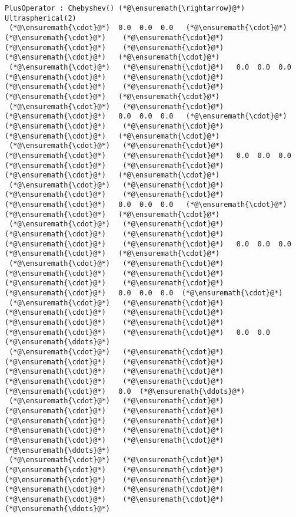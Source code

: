 \documentclass[12pt,landscape]{article}
\begin{document}
{\begin{lstlisting}
PlusOperator : Chebyshev() (*@\ensuremath{\rightarrow}@*) Ultraspherical(2)
 (*@\ensuremath{\cdot}@*)  0.0  0.0  0.0   (*@\ensuremath{\cdot}@*)    (*@\ensuremath{\cdot}@*)    (*@\ensuremath{\cdot}@*)    (*@\ensuremath{\cdot}@*)    (*@\ensuremath{\cdot}@*)    (*@\ensuremath{\cdot}@*)   (*@\ensuremath{\cdot}@*)
 (*@\ensuremath{\cdot}@*)   (*@\ensuremath{\cdot}@*)   0.0  0.0  0.0   (*@\ensuremath{\cdot}@*)    (*@\ensuremath{\cdot}@*)    (*@\ensuremath{\cdot}@*)    (*@\ensuremath{\cdot}@*)    (*@\ensuremath{\cdot}@*)   (*@\ensuremath{\cdot}@*)
 (*@\ensuremath{\cdot}@*)   (*@\ensuremath{\cdot}@*)    (*@\ensuremath{\cdot}@*)   0.0  0.0  0.0   (*@\ensuremath{\cdot}@*)    (*@\ensuremath{\cdot}@*)    (*@\ensuremath{\cdot}@*)    (*@\ensuremath{\cdot}@*)   (*@\ensuremath{\cdot}@*)
 (*@\ensuremath{\cdot}@*)   (*@\ensuremath{\cdot}@*)    (*@\ensuremath{\cdot}@*)    (*@\ensuremath{\cdot}@*)   0.0  0.0  0.0   (*@\ensuremath{\cdot}@*)    (*@\ensuremath{\cdot}@*)    (*@\ensuremath{\cdot}@*)   (*@\ensuremath{\cdot}@*)
 (*@\ensuremath{\cdot}@*)   (*@\ensuremath{\cdot}@*)    (*@\ensuremath{\cdot}@*)    (*@\ensuremath{\cdot}@*)    (*@\ensuremath{\cdot}@*)   0.0  0.0  0.0   (*@\ensuremath{\cdot}@*)    (*@\ensuremath{\cdot}@*)   (*@\ensuremath{\cdot}@*)
 (*@\ensuremath{\cdot}@*)   (*@\ensuremath{\cdot}@*)    (*@\ensuremath{\cdot}@*)    (*@\ensuremath{\cdot}@*)    (*@\ensuremath{\cdot}@*)    (*@\ensuremath{\cdot}@*)   0.0  0.0  0.0   (*@\ensuremath{\cdot}@*)   (*@\ensuremath{\cdot}@*)
 (*@\ensuremath{\cdot}@*)   (*@\ensuremath{\cdot}@*)    (*@\ensuremath{\cdot}@*)    (*@\ensuremath{\cdot}@*)    (*@\ensuremath{\cdot}@*)    (*@\ensuremath{\cdot}@*)    (*@\ensuremath{\cdot}@*)   0.0  0.0  0.0  (*@\ensuremath{\cdot}@*)
 (*@\ensuremath{\cdot}@*)   (*@\ensuremath{\cdot}@*)    (*@\ensuremath{\cdot}@*)    (*@\ensuremath{\cdot}@*)    (*@\ensuremath{\cdot}@*)    (*@\ensuremath{\cdot}@*)    (*@\ensuremath{\cdot}@*)    (*@\ensuremath{\cdot}@*)   0.0  0.0  (*@\ensuremath{\ddots}@*)
 (*@\ensuremath{\cdot}@*)   (*@\ensuremath{\cdot}@*)    (*@\ensuremath{\cdot}@*)    (*@\ensuremath{\cdot}@*)    (*@\ensuremath{\cdot}@*)    (*@\ensuremath{\cdot}@*)    (*@\ensuremath{\cdot}@*)    (*@\ensuremath{\cdot}@*)    (*@\ensuremath{\cdot}@*)   0.0  (*@\ensuremath{\ddots}@*)
 (*@\ensuremath{\cdot}@*)   (*@\ensuremath{\cdot}@*)    (*@\ensuremath{\cdot}@*)    (*@\ensuremath{\cdot}@*)    (*@\ensuremath{\cdot}@*)    (*@\ensuremath{\cdot}@*)    (*@\ensuremath{\cdot}@*)    (*@\ensuremath{\cdot}@*)    (*@\ensuremath{\cdot}@*)    (*@\ensuremath{\cdot}@*)   (*@\ensuremath{\ddots}@*)
 (*@\ensuremath{\cdot}@*)   (*@\ensuremath{\cdot}@*)    (*@\ensuremath{\cdot}@*)    (*@\ensuremath{\cdot}@*)    (*@\ensuremath{\cdot}@*)    (*@\ensuremath{\cdot}@*)    (*@\ensuremath{\cdot}@*)    (*@\ensuremath{\cdot}@*)    (*@\ensuremath{\cdot}@*)    (*@\ensuremath{\cdot}@*)   (*@\ensuremath{\ddots}@*)
\end{lstlisting}


}
\end{document}
